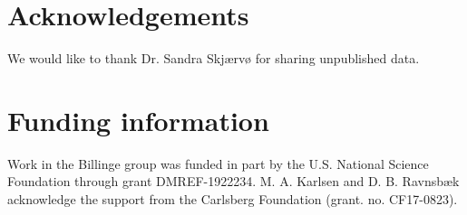 \documentclass[preprint]{iucr}
\begin{document}
\section{Acknowledgements}

We would like to thank Dr. Sandra Skjærvø for sharing unpublished  data.

\section{Funding information}

Work in the Billinge group was funded in part by the U.S. National Science Foundation through grant DMREF-1922234. M. A. Karlsen and D. B. Ravnsbæk acknowledge the support from the Carlsberg Foundation (grant. no. CF17-0823). 
%
\newpage
%






\setcounter{figure}{0}
\setcounter{equation}{0}
\setcounter{table}{0}
\makeatletter
\renewcommand{\fnum@figure}{Fig.~S\thefigure}
\renewcommand{\theequation}{S\arabic{equation}}
\renewcommand{\thetable}{S\arabic{table}}
\makeatother

\end{document}
